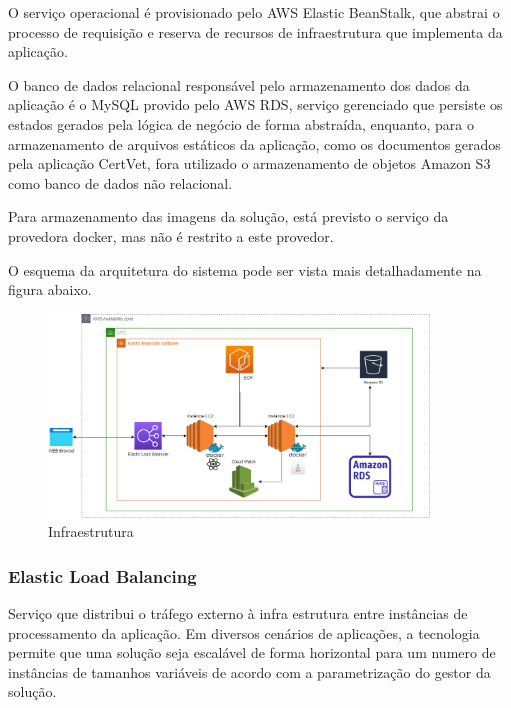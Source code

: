\documentclass[
    12pt,               %
    openright,          %
    oneside,
    a4paper,            %
    BIBLATEX,           %
    TODO,               %
    english,            %
    brazil              %
    ]{ifsp-spo-inf-ctds}
\begin{document}
        O serviço operacional é provisionado pelo AWS Elastic BeanStalk, que abstrai o processo de requisição e reserva de recursos de infraestrutura que implementa da aplicação.
        
        O banco de dados relacional responsável pelo armazenamento dos dados da aplicação é o MySQL provido pelo AWS RDS, serviço gerenciado que persiste os estados gerados pela lógica de negócio de forma abstraída, enquanto, para o armazenamento de arquivos estáticos da aplicação, como os documentos gerados pela aplicação CertVet, fora utilizado o armazenamento de objetos Amazon S3 como banco de dados não relacional.
        
        Para armazenamento das imagens da solução, está previsto o serviço da provedora docker, mas não é restrito a este provedor.
        
        O esquema da arquitetura do sistema pode ser vista mais detalhadamente na figura abaixo.
        
        
        \begin{figure}[H]
            \centering
            \includegraphics[width=0.9\textwidth]{ArquiteturaAplicacao.png}
            \caption{Infraestrutura}
            \label{fig:infra}
        \end{figure}
        
        \subsubsection{Elastic Load Balancing}
        
            Serviço que distribui o tráfego externo à infra estrutura entre instâncias de processamento da aplicação. Em diversos cenários de aplicações, a tecnologia permite que uma solução seja escalável de forma horizontal para um numero de instâncias de tamanhos variáveis de acordo com a parametrização do gestor da solução.
        
\end{document}
